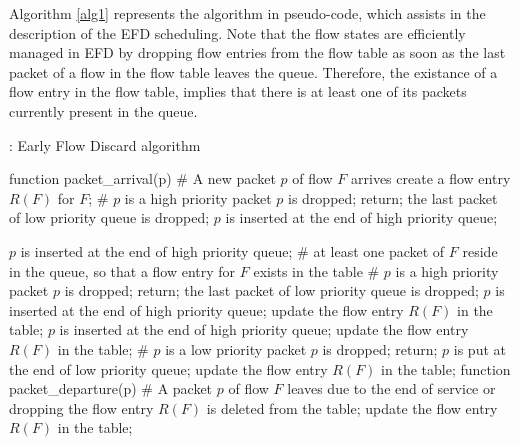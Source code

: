 \documentclass[preprint,12pt]{elsarticle}
\begin{document}
Algorithm \ref{alg1} represents the algorithm in pseudo-code, which assists in the description of the EFD scheduling. Note that the flow states are efficiently managed in EFD by dropping flow entries from the flow table as soon as the last packet of a flow in the flow table leaves the queue. Therefore, the existance of a flow entry in the flow table, implies that there is at least one of its packets currently present in the queue. 

\begin{algorithm}
\scriptsize
\caption{: Early Flow Discard algorithm}
\label{alg1}
\begin{algorithmic}[1]
\STATE function packet\_arrival(p)
\STATE \# A new packet $p$ of flow $F$ arrives
\STATE create a flow entry $R(F)$ for $F$;
\STATE \# $p$ is a high priority packet
\STATE $p$ is dropped;
\STATE return;
\ELSE
\STATE the last packet of low priority queue is dropped;
\STATE $p$ is inserted at the end of high priority queue;
\ENDIF

\ELSE
\STATE $p$ is inserted at the end of high priority queue;
\ENDIF
\ELSE
\STATE \# at least one packet of $F$ reside in the queue, so that a flow entry for $F$ exists in the table
\STATE \# $p$ is a high priority packet
\STATE $p$ is dropped;
\STATE return;
\ELSE
\STATE the last packet of low priority queue is dropped;
\STATE $p$ is inserted at the end of high priority queue;
\STATE update the flow entry $R(F)$ in the table;
\ENDIF
\ELSE
\STATE $p$ is inserted at the end of high priority queue;
\STATE update the flow entry $R(F)$ in the table;
\ENDIF
\ELSE
\STATE \# $p$ is a low priority packet
\STATE $p$ is dropped;
\STATE return;
\ELSE
\STATE $p$ is put at the end of low priority queue;
\STATE update the flow entry $R(F)$ in the table;
\ENDIF
\ENDIF
\ENDIF
\STATE
\STATE function packet\_departure(p)
\STATE \# A packet $p$ of flow $F$ leaves due to the end of service or dropping 
\STATE the flow entry $R(F)$ is deleted from the table;
\ELSE
\STATE update the flow entry $R(F)$ in the table;
\ENDIF

\end{algorithmic}
\end{algorithm}
\end{document}
